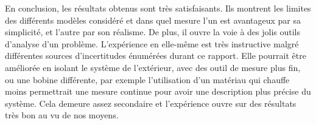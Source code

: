 En conclusion, les résultats obtenus sont très satisfaisants. Ils montrent les limites des différents modèles considéré et dans quel mesure l'un est avantageux par sa simplicité, et l'autre par son réalisme. De plus, il ouvre la voie à des jolis outils d'analyse d'un problème. L'expérience en elle-même est très instructive malgré différentes sources d'incertitudes énumérées durant ce rapport. Elle pourrait être améliorée en isolant le système de l'extérieur, avec des outil de mesure plus fin, ou une bobine différente, par exemple l'utilisation d'un matériau qui chauffe moins permettrait une mesure continue pour avoir une description plus précise du système. Cela demeure assez secondaire et l'expérience ouvre sur des résultats très bon au vu de nos moyens.